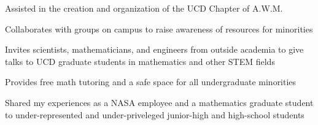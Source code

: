 \documentclass[letterpaper]{deedy-resume} %
\begin{document}
\begin{minipage}[t]{0.66\textwidth}
\vspace{2pt} %

\begin{tightitemize}
    \item Assisted in the creation and organization of the UCD Chapter of A.W.M.
    \item Collaborates with groups on campus to raise awareness of resources for minorities
\end{tightitemize}

\vspace{2pt}



\begin{tightitemize}
    \item Invites scientists, mathematicians, and engineers from outside academia to give talks to UCD graduate students in mathematics and other STEM fields
\end{tightitemize}

\vspace{2pt}

\begin{tightitemize}
    \item Provides free math tutoring and a safe space for all undergraduate minorities
\end{tightitemize}

\vspace{2pt}

\begin{tightitemize}
    \item Shared my experiences as a NASA employee and a mathematics graduate student to under-represented and under-priveleged junior-high and high-school students
\end{tightitemize}


\end{minipage} %
\end{document}
